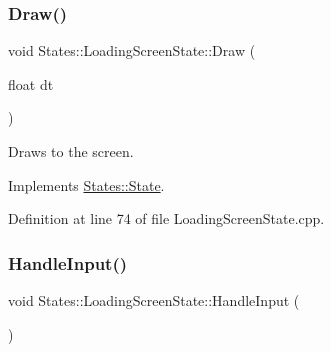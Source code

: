 \subsubsection{\texorpdfstring{Draw()}{Draw()}}
{\footnotesize\ttfamily void States\+::\+Loading\+Screen\+State\+::\+Draw (\begin{DoxyParamCaption}\item[{float}]{dt }\end{DoxyParamCaption})\hspace{0.3cm}{\ttfamily [virtual]}}



Draws to the screen. 

\begin{DoxyVerb}\end{DoxyVerb}
 

Implements \mbox{\hyperlink{class_states_1_1_state_af5faf0a12478e595ec488fa6108fa490}{States\+::\+State}}.



Definition at line 74 of file Loading\+Screen\+State.\+cpp.


\begin{DoxyCode}{0}

\end{DoxyCode}
\mbox{\label{class_states_1_1_loading_screen_state_a3a473b2cf717f183e4573344405b7b49}} 
\subsubsection{\texorpdfstring{HandleInput()}{HandleInput()}}
{\footnotesize\ttfamily void States\+::\+Loading\+Screen\+State\+::\+Handle\+Input (\begin{DoxyParamCaption}{ }\end{DoxyParamCaption})\hspace{0.3cm}{\ttfamily [virtual]}}



